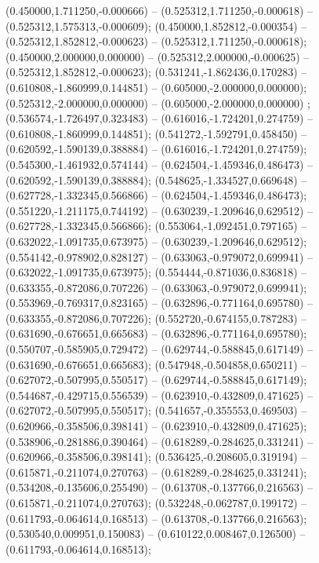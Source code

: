  (0.450000,1.711250,-0.000666) -- (0.525312,1.711250,-0.000618) -- (0.525312,1.575313,-0.000609);
 (0.450000,1.852812,-0.000354) -- (0.525312,1.852812,-0.000623) -- (0.525312,1.711250,-0.000618);
 (0.450000,2.000000,0.000000) -- (0.525312,2.000000,-0.000625) -- (0.525312,1.852812,-0.000623);
 (0.531241,-1.862436,0.170283) -- (0.610808,-1.860999,0.144851) -- (0.605000,-2.000000,0.000000);
 (0.525312,-2.000000,0.000000) -- (0.605000,-2.000000,0.000000) ;
 (0.536574,-1.726497,0.323483) -- (0.616016,-1.724201,0.274759) -- (0.610808,-1.860999,0.144851);
 (0.541272,-1.592791,0.458450) -- (0.620592,-1.590139,0.388884) -- (0.616016,-1.724201,0.274759);
 (0.545300,-1.461932,0.574144) -- (0.624504,-1.459346,0.486473) -- (0.620592,-1.590139,0.388884);
 (0.548625,-1.334527,0.669648) -- (0.627728,-1.332345,0.566866) -- (0.624504,-1.459346,0.486473);
 (0.551220,-1.211175,0.744192) -- (0.630239,-1.209646,0.629512) -- (0.627728,-1.332345,0.566866);
 (0.553064,-1.092451,0.797165) -- (0.632022,-1.091735,0.673975) -- (0.630239,-1.209646,0.629512);
 (0.554142,-0.978902,0.828127) -- (0.633063,-0.979072,0.699941) -- (0.632022,-1.091735,0.673975);
 (0.554444,-0.871036,0.836818) -- (0.633355,-0.872086,0.707226) -- (0.633063,-0.979072,0.699941);
 (0.553969,-0.769317,0.823165) -- (0.632896,-0.771164,0.695780) -- (0.633355,-0.872086,0.707226);
 (0.552720,-0.674155,0.787283) -- (0.631690,-0.676651,0.665683) -- (0.632896,-0.771164,0.695780);
 (0.550707,-0.585905,0.729472) -- (0.629744,-0.588845,0.617149) -- (0.631690,-0.676651,0.665683);
 (0.547948,-0.504858,0.650211) -- (0.627072,-0.507995,0.550517) -- (0.629744,-0.588845,0.617149);
 (0.544687,-0.429715,0.556539) -- (0.623910,-0.432809,0.471625) -- (0.627072,-0.507995,0.550517);
 (0.541657,-0.355553,0.469503) -- (0.620966,-0.358506,0.398141) -- (0.623910,-0.432809,0.471625);
 (0.538906,-0.281886,0.390464) -- (0.618289,-0.284625,0.331241) -- (0.620966,-0.358506,0.398141);
 (0.536425,-0.208605,0.319194) -- (0.615871,-0.211074,0.270763) -- (0.618289,-0.284625,0.331241);
 (0.534208,-0.135606,0.255490) -- (0.613708,-0.137766,0.216563) -- (0.615871,-0.211074,0.270763);
 (0.532248,-0.062787,0.199172) -- (0.611793,-0.064614,0.168513) -- (0.613708,-0.137766,0.216563);
 (0.530540,0.009951,0.150083) -- (0.610122,0.008467,0.126500) -- (0.611793,-0.064614,0.168513);
